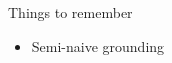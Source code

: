 \begin{frame}{Things to remember}
  \bigskip
  \begin{itemize}
  \item Semi-naive grounding
  \end{itemize}
\end{frame}
%
